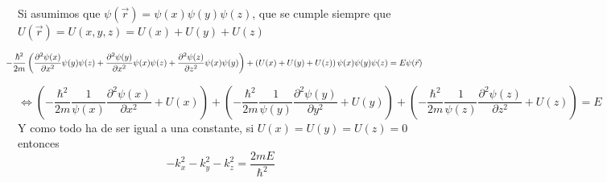 \documentclass{report}
\begin{document}
  \vspace{0.3cm}
  \noindent Si asumimos que $\psi(\vec{r})=\psi(x)\psi(y)\psi(z)$, que se 
  cumple siempre que $U(\vec{r})=U(x,y,z)=U(x)+U(y)+U(z)$

  \[\hspace{-0.5cm}-\dfrac{\hbar^2}{2m}\left(\dfrac{\partial^2 \psi(x)}{\partial x^2}\psi(y)\psi(z)+
  \dfrac{\partial^2 \psi(y)}{\partial x^2}\psi(x)\psi(z)+\dfrac{\partial^2 \psi(z)}{\partial z^2}\psi(x)\psi(y)\right)+
  \left(U(x)+U(y)+U(z)\right)\psi(x)\psi(y)\psi(z)=E\psi(\vec{r})\]

  \[\Longleftrightarrow \left(-\dfrac{\hbar^2}{2m}\dfrac{1}{\psi(x)}\dfrac{\partial^2\psi(x)}{\partial x^2}+U(x)\right)+
  \left(-\dfrac{\hbar^2}{2m}\dfrac{1}{\psi(y)}\dfrac{\partial^2\psi(y)}{\partial y^2}+U(y)\right)+
  \left(-\dfrac{\hbar^2}{2m}\dfrac{1}{\psi(z)}\dfrac{\partial^2\psi(z)}{\partial z^2}+U(z)\right)=E\]
  Y como todo ha de ser igual a una constante, si $U(x)=U(y)=U(z)=0$ entonces
  \[-k_x^2-k_y^2-k_z^2=\dfrac{2mE}{\hbar^2}\]

\end{document}

